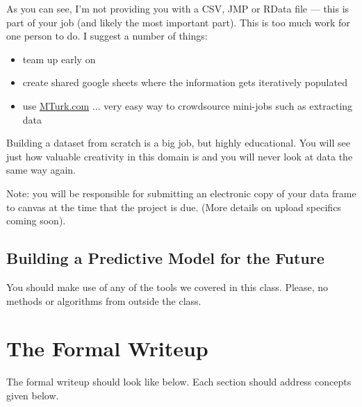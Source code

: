 \documentclass[12pt]{article}
\begin{document}
As you can see, I'm not providing you with a CSV, JMP or RData file --- this is part of your job (and likely the most important part). This is too much work for one person to do. I suggest a number of things:

\begin{itemize}
\item team up early on
\item create shared google sheets where the information gets iteratively populated
\item use \url{MTurk.com} ... very easy way to crowdsource mini-jobs such as extracting data
\end{itemize}





Building a dataset from scratch is a big job, but highly educational. You will see just how valuable creativity in this domain is and you will never look at data the same way again.

Note: you will be responsible for submitting an electronic copy of your data frame to canvas at the time that the project is due. (More details on upload specifics coming soon).

\subsection{Building a Predictive Model for the Future}

You should make use of any of the tools we covered in this class. Please, no methods or algorithms from outside the class.



\section{The Formal Writeup}

The formal writeup should look like below. Each section should address concepts given below.  \\
\end{document}
